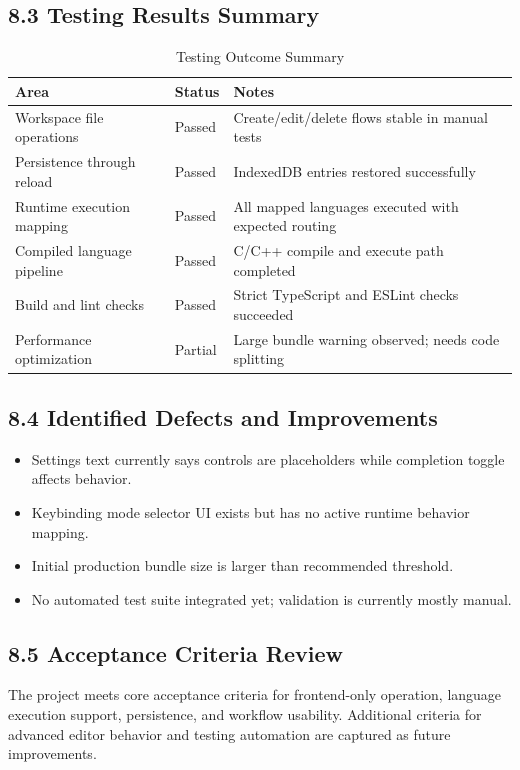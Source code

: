 \subsection*{8.3 Testing Results Summary}
\begin{table}[H]
\centering
\caption{Testing Outcome Summary}
\begin{tabular}{p{4.5cm}p{2.3cm}p{6.0cm}}
\toprule
\textbf{Area} & \textbf{Status} & \textbf{Notes} \\
\midrule
Workspace file operations & Passed & Create/edit/delete flows stable in manual tests \\
Persistence through reload & Passed & IndexedDB entries restored successfully \\
Runtime execution mapping & Passed & All mapped languages executed with expected routing \\
Compiled language pipeline & Passed & C/C++ compile and execute path completed \\
Build and lint checks & Passed & Strict TypeScript and ESLint checks succeeded \\
Performance optimization & Partial & Large bundle warning observed; needs code splitting \\
\bottomrule
\end{tabular}
\end{table}

\subsection*{8.4 Identified Defects and Improvements}
\begin{itemize}[leftmargin=8mm]
\item Settings text currently says controls are placeholders while completion toggle affects behavior.
\item Keybinding mode selector UI exists but has no active runtime behavior mapping.
\item Initial production bundle size is larger than recommended threshold.
\item No automated test suite integrated yet; validation is currently mostly manual.
\end{itemize}

\subsection*{8.5 Acceptance Criteria Review}
The project meets core acceptance criteria for frontend-only operation, language execution support, persistence, and workflow usability. Additional criteria for advanced editor behavior and testing automation are captured as future improvements.

